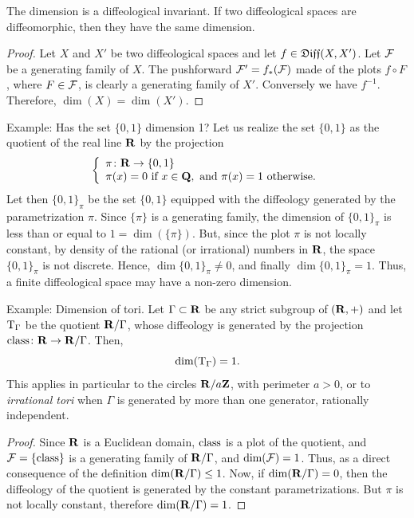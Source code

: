 \begin{Article}{The dimension is a diffeological invariant.}{}
  \label{The-dimension-is-a-diffeological-invariant}
  If two diffeological spaces are diffeomorphic, then they have
  the same dimension.
\end{Article}

\begin{proof}
  Let $X$ and $X'$ be two diffeological spaces and let $f \in \mathfrak{Diff}(X,X')$.
  Let $\mathcal{F}$ be a generating family of $X$.
  The pushforward $\mathcal{F}' = f_*(\mathcal{F})$ made of the plots $f \circ F$,
  where $F \in \mathcal{F}$,
  is clearly a generating family of $X'$.
  Conversely we have $f^{-1}$.
  Therefore,
  $\dim(X) = \dim(X')$.
\end{proof}

\begin{Article}{Example: Has the set $\{0,1\}$ dimension 1?}{}
  Let us realize the set $\{0,1\}$ as the quotient of the real line $\mathbf{R}$ by the projection
  $$%
    \left\{
    \begin{array}{l}
    \pi \colon \RR \to \{0,1\} \\
    \pi(x) = 0 \text{ if } x \in \QQ, \text{ and } \pi(x) = 1 \text{ otherwise.}
    \end{array}
    \right.
    $$%
  Let then $\{0,1\}_{\pi}$ be the set $\{0,1\}$ equipped with the diffeology generated by the parametrization $\pi$.
  Since $\{\pi\}$ is a generating family,
  the dimension of $\{0,1\}_\pi$ is less than or equal to $1 = \dim(\{\pi\})$.
  But,
  since the plot $\pi$ is not locally constant,
  by density of the rational (or irrational) numbers in $\mathbf{R}$,
  the space $\{0,1\}_\pi$ is not discrete.
  Hence, $\dim\{0,1\}_\pi\neq 0$,
  and finally $\dim \{0,1\}_\pi = 1$.
  Thus,
  a finite diffeological space may have a non-zero dimension.
\end{Article}

\begin{Article}{Example: Dimension of tori.}{}
  Let $\Gamma \subset \mathbf{R}$ be any strict subgroup of $(\mathbf{R},+)$ and let $\mathrm{T}_\Gamma$ be the quotient $\mathbf{R}/\Gamma$,
  whose diffeology is generated by the projection  $\operatorname{class} \colon \mathbf{R} \to \mathbf{R}/\Gamma$.
  Then,
  $$%
    \dim(\Torus_\Gamma) = 1.
    $$%
  This applies in particular to the circles $\mathbf{R}/a \mathbf{Z}$,
  with perimeter $a > 0$,
  or to \emph{irrational tori} when $\Gamma$ is generated by more than one generator,
  rationally independent.
\end{Article}

\begin{proof}
  Since $\mathbf{R}$ is a Euclidean domain,
  $\operatorname{class}$ is a plot of the quotient,
  and $\mathcal{F} = \{\operatorname{class}\}$ is a generating family of $\mathbf{R}/\Gamma$,
  and $\dim(\mathcal{F}) = 1$.
  Thus,
  as a direct consequence of the definition
  $\dim(\mathbf{R}/\Gamma) \leq 1$.
  Now,
  if $\dim(\mathbf{R}/\Gamma) = 0$,
  then the diffeology of the quotient is generated by the constant parametrizations.
  But $\pi$ is not locally constant,
  therefore $\dim(\mathbf{R}/\Gamma) = 1$.
\end{proof}


